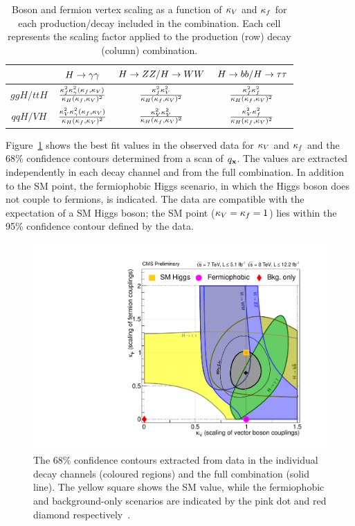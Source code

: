 \begin{table}
\begin{tabular}{|c|c|c|c|}
\hline
 & $H\rightarrow\gamma\gamma$ & $H\rightarrow ZZ / H\rightarrow WW$ & $H\rightarrow bb / H\rightarrow\tau\tau$ \\
\hline
$ggH/ttH$ & $\frac{\kappa_{f}^{2}\kappa_{\gamma}^{2}(\kappa_{f},\kappa_{V})}{\kappa_{H}(\kappa_{f},\kappa_{V})^{2}}$ & 
	    $\frac{\kappa_{f}^{2}\kappa_{V}^{2}}{\kappa_{H}(\kappa_{f},\kappa_{V})^{2}}$ & $\frac{\kappa_{f}^{2}\kappa_{f}^{2}}{\kappa_{H}(\kappa_{f},\kappa_{V})^{2}}$ \\
\hline
$qqH/VH$ &  $\frac{\kappa_{V}^{2}\kappa_{\gamma}^{2}(\kappa_{f},\kappa_{V})}{\kappa_{H}(\kappa_{f},\kappa_{V})^{2}}$ & 
	    $\frac{\kappa_{V}^{2}\kappa_{V}^{2}}{\kappa_{H}(\kappa_{f},\kappa_{V})^{2}}$ & $\frac{\kappa_{V}^{2}\kappa_{f}^{2}}{\kappa_{H}(\kappa_{f},\kappa_{V})^{2}}$ \\
\hline
\end{tabular}
\caption{Boson and fermion vertex scaling as a function of $\kappa_{V}$ and $\kappa_{f}$ 
for each production/decay included in the combination. Each cell represents the scaling 
factor applied to the production (row) decay (column) combination.}
\label{tab:kvkf}
\end{table}

Figure~\ref{fig:kvkf} shows the best fit values in the observed data 
for $\kappa_{V}$ and $\kappa_{f}$ and the 68\% confidence contours determined from a scan of $q_{\mathbf{x}}$.
The values are extracted independently in each decay channel and from the
full combination. In addition to the SM point, the fermiophobic Higgs scenario,
in which the Higgs boson does not couple to fermions, is indicated.
The data are compatible with the expectation of a SM Higgs boson; the SM 
point ($\kappa_{V}=\kappa_{f}=1$) lies within the 95\% confidence contour defined by the data.

\begin{figure}
\includegraphics[width=.8\textwidth]{combinations/Figure_014-b.pdf}
\caption{The 68\% confidence contours extracted from data in the 
individual decay channels (coloured regions) and the full 
combination (solid line). The yellow square shows the SM value, while
the fermiophobic and background-only scenarios are indicated
by the pink dot and red diamond respectively~\citep{HIG-12-045}.}
\label{fig:kvkf}
\end{figure}
